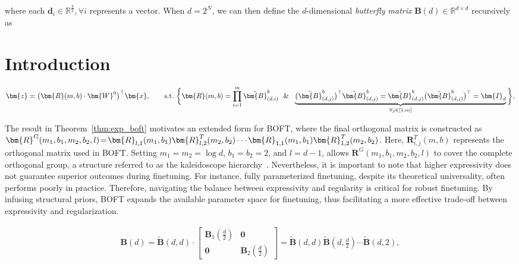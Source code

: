 where each $\bm{d}_i\in\mathbb{R}^{\frac{k}{2}}, \forall i$ represents a vector. When $d=2^N$, we can then define the $d$-dimensional \emph{butterfly matrix} $\bm{B}(d)\in\mathbb{R}^{d\times d}$ recursively as

\section{Introduction}

\begin{equation}
    \begin{aligned}\nonumber
    \bm{z} = \big(\bm{R}(m, b) \cdot \bm{W}^0\big)^\top \bm{x}, \qquad \text{s.t.}~\bigg{\{} \bm{R}(m, b) = \prod_{i=1}^m \tilde{\bm{B}}^b_{(d, i)} ~~\&~~ \underbrace{\big(\tilde{\bm{B}}^b_{(d, j)}\big)^\top \tilde{\bm{B}}^b_{(d, j)} = \tilde{\bm{B}}^b_{(d, j)} \big(\tilde{\bm{B}}^b_{(d, j)}\big)^\top = \bm{I}_d}_{\forall j\in [1, m]} \bigg{\}},
    \end{aligned}
\end{equation}

The result in Theorem~\ref{thm:exp_boft} motivates an extended form for BOFT, where the final orthogonal matrix is constructed as $\thickmuskip=2mu \medmuskip=2mu \bm{R}^G(m_1,b_1,m_2,b_2,l)=\bm{R}_{l,1}(m_1,b_1)\bm{R}_{l,2}^T(m_2,b_2)\cdots\bm{R}_{1,1}(m_1,b_1)\bm{R}_{1,2}^T(m_2,b_2)$. Here, $\bm{R}_{i,j}^T(m,b)$ represents the orthogonal matrix used in BOFT. Setting $m_1=m_2=\log d$, $b_1=b_2=2$, and $l=d-1$, allows $\bm{R}^G(m_1,b_1,m_2,b_2,l)$ to cover the complete orthogonal group, a structure referred to as the kaleidoscope hierarchy~\cite{dao2019kaleidoscope}. Nevertheless, it is important to note that higher expressivity does not guarantee superior outcomes during finetuning. For instance, fully parameterized finetuning, despite its theoretical universality, often performs poorly in practice. Therefore, navigating the balance between expressivity and regularity is critical for robust finetuning. By infusing structural priors, BOFT expands the available parameter space for finetuning, thus facilitating a more effective trade-off between expressivity and regularization.

\begin{equation}
\begin{aligned}
    \!\!\bm{B}(d)=\tilde{\bm{B}}(d,d)\!\cdot\!\begin{bmatrix}
    \bm{B}_1(\frac{d}{2})\!\!\!\!\! & \bm{0} \\
    \bm{0}\!\!\!\!\! &\bm{B}_2(\frac{d}{2})
    \end{bmatrix}= \tilde{\bm{B}}(d,d)\tilde{\bm{B}}(d,\frac{d}{2})\cdots\tilde{\bm{B}}(d,2),
\end{aligned}
\end{equation}


